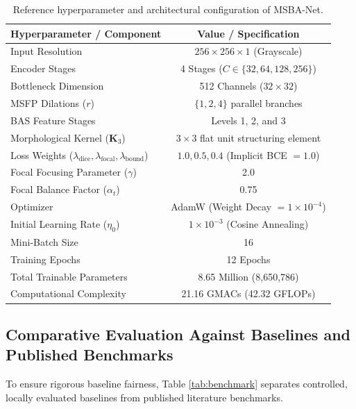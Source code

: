 \documentclass{ieeeaccess}
\begin{document}
\begin{table}[!t]
\centering
\fontsize{7.5pt}{9.5pt}\selectfont
\caption{Reference hyperparameter and architectural configuration of MSBA-Net.}
\label{tab:hyperparameters}
\begin{tabular*}{\columnwidth}{@{\extracolsep{\fill}}lc@{}}
\toprule
\textbf{Hyperparameter / Component} & \textbf{Value / Specification} \\
\midrule
Input Resolution & $256 \times 256 \times 1$ (Grayscale) \\
Encoder Stages & 4 Stages ($C \in \{32, 64, 128, 256\}$) \\
Bottleneck Dimension & 512 Channels ($32 \times 32$) \\
MSFP Dilations ($r$) & $\{1, 2, 4\}$ parallel branches \\
BAS Feature Stages & Levels 1, 2, and 3 \\
Morphological Kernel ($\mathbf{K}_3$) & $3 \times 3$ flat unit structuring element \\
Loss Weights ($\lambda_{\text{dice}}, \lambda_{\text{focal}}, \lambda_{\text{bound}}$) & $1.0, 0.5, 0.4$ (Implicit BCE $= 1.0$) \\
Focal Focusing Parameter ($\gamma$) & 2.0 \\
Focal Balance Factor ($\alpha_t$) & 0.75 \\
Optimizer & AdamW (Weight Decay $= 1 \times 10^{-4}$) \\
Initial Learning Rate ($\eta_0$) & $1 \times 10^{-3}$ (Cosine Annealing) \\
Mini-Batch Size & 16 \\
Training Epochs & 12 Epochs \\
Total Trainable Parameters & 8.65 Million (8,650,786) \\
Computational Complexity & 21.16 GMACs (42.32 GFLOPs) \\
\bottomrule
\end{tabular*}
\end{table}

\subsection{Comparative Evaluation Against Baselines and Published Benchmarks}
\label{sec:comparative_evaluation}
To ensure rigorous baseline fairness, Table \ref{tab:benchmark} separates controlled, locally evaluated baselines from published literature benchmarks.
\end{document}
